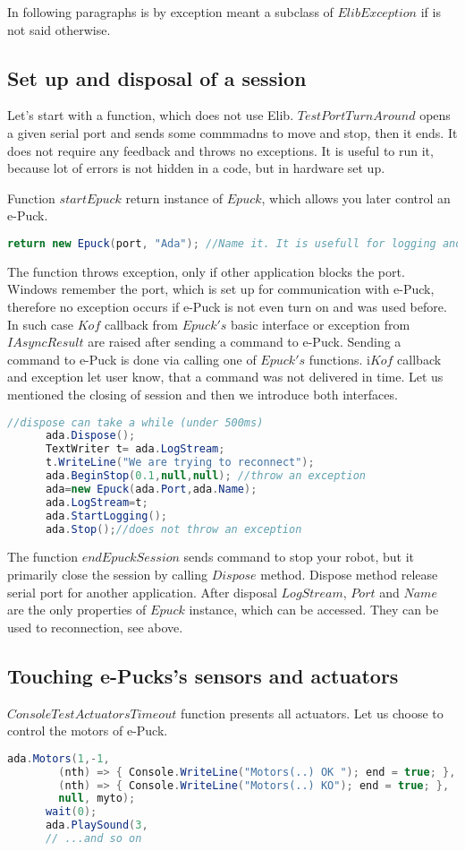 	In following paragraphs is by exception meant a subclass of $ElibException$ if is not said otherwise.
\subsection{Set up and disposal of a session}\label{sec:session}
	Let's start with a function, which does not use Elib. $TestPortTurnAround$ opens a given serial port
	and sends some commmadns to move and stop, then it ends. It does not require any feedback and throws no exceptions.
	It is useful to run it, because lot of errors is not hidden in a code, but in hardware set up.

	Function $startEpuck$ return instance of $Epuck$, which allows you later control an e-Puck.
\begin{lstlisting}[language=cs]
      return new Epuck(port, "Ada"); //Name it. It is usefull for logging and debugging.
\end{lstlisting}
	The function throws exception, only if other application blocks the port. Windows remember
	the port, which is set up for communication with e-Puck, therefore
	no exception occurs if e-Puck is not even turn on and was used before.
	In such case $Kof$ callback from $Epuck's$ basic interface or exception	from $IAsyncResult$ are raised after sending a command to e-Puck.
	Sending a command to e-Puck is done via calling one of $Epuck's$ functions.
	i$Kof$ callback and exception let user know, that a command was not delivered in time.
	Let us mentioned the closing of session and then we introduce both interfaces.
\begin{lstlisting}[language=cs]
      //dispose can take a while (under 500ms)
      ada.Dispose();
      TextWriter t= ada.LogStream;
      t.WriteLine("We are trying to reconnect");
      ada.BeginStop(0.1,null,null); //throw an exception
      ada=new Epuck(ada.Port,ada.Name);
      ada.LogStream=t;
      ada.StartLogging();
      ada.Stop();//does not throw an exception
\end{lstlisting}
	The function $endEpuckSession$ sends command to stop your robot, but it primarily close the session by calling $Dispose$ method.
	Dispose method release serial port for another application. After disposal $LogStream$, $Port$ and $Name$ are the 
	only properties of $Epuck$ instance, which can be accessed. They can be used to reconnection, see above.

\subsection{Touching e-Pucks's sensors and actuators}\label{sec:touching}
	$ConsoleTestActuatorsTimeout$ function presents all actuators. Let us choose to control the motors of e-Puck.
\begin{lstlisting}[language=cs]
      ada.Motors(1,-1,
        (nth) => { Console.WriteLine("Motors(..) OK "); end = true; },
        (nth) => { Console.WriteLine("Motors(..) KO"); end = true; },
        null, myto);
      wait(0);
      ada.PlaySound(3,
      // ...and so on
\end{lstlisting}
	
